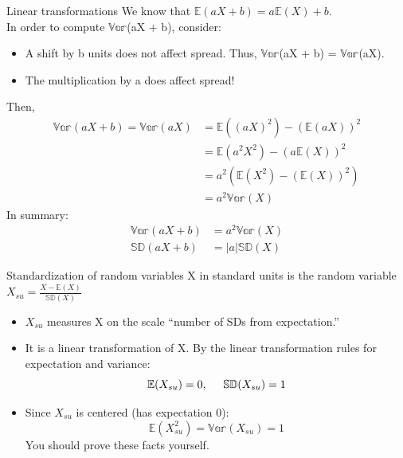 \documentclass[aspectratio=169]{../latex_main/tntbeamer}  %
\begin{document}
	
	\begin{frame}[c]{Linear transformations}
	   We know that       $\mathbb{E}(aX + b) = a\mathbb{E}(X) + b$. \\                  In order to compute $\mathbb{Var}$(aX + b), consider:
	    \begin{itemize}
	        \item A shift by b units does not affect spread. Thus, $\mathbb{Var}$(aX + b) = $\mathbb{Var}$(aX).
	        \item The multiplication by a does affect spread!
	    \end{itemize}
	    Then,
	    \begin{align*}
	        \mathbb{Var}(aX + b) = \mathbb{Var}(aX) &= \mathbb{E}((aX)^2) - (\mathbb{E}(aX))^2\\
	        &= \mathbb{E}(a^2X^2) - (a\mathbb{E}(X))^2\\
	        &= a^2(\mathbb{E}(X^2) - (\mathbb{E}(X))^2)\\
	        &= a^2\mathbb{Var}(X)
	    \end{align*}
	    In summary:
	    \begin{align*}
	        \mathbb{Var}(aX + b) &= a^2\mathbb{Var}(X)\\
	        \mathbb{SD}(aX + b) &= |a|\mathbb{SD}(X)
	    \end{align*}
	\end{frame}
	
	
	\begin{frame}[c]{Standardization of random variables}
	   X in standard units is the random variable $X_{su} = \frac{X- \mathbb{E}(X)}{\mathbb{SD}(X)}$
	   \begin{itemize}
	       \item $X_{su}$ measures X on the scale “number of SDs from expectation.”
	       \item It is a linear transformation of X. By the linear transformation rules for expectation and variance:
	       \begin{equation*}
	           \mathbb{E}(X_{su})  = 0, \hspace{5mm} \mathbb{SD}(X_{su}) = 1
	       \end{equation*}
	       \item Since $X_{su}$ is centered (has expectation 0):
	       \begin{equation*}
	           \mathbb{E}(X^2_{su}) = \mathbb{Var}(X_{su}) = 1
	       \end{equation*}
	       You should prove these facts yourself.
	   \end{itemize}
	\end{frame}
	
\end{document}
